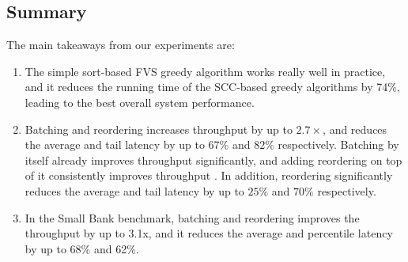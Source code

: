 
%





\subsection{Summary}

The main takeaways from our experiments are:

\begin{enumerate}[leftmargin=*, nolistsep]
\item The simple sort-based FVS greedy algorithm works really well in practice, and it reduces the running time of the SCC-based greedy algorithms by 74\%, leading to the best overall system performance. 
 
\item Batching and reordering increases throughput by up to $2.7\times$, and reduces the average and tail latency by up to $67\%$ and $82\%$ respectively.
Batching by itself already improves throughput significantly, and adding reordering on top of it consistently improves throughput . In addition, reordering significantly reduces the average and tail latency by up to $25\%$ and $70\%$ respectively. 


\item In the Small Bank benchmark, batching and reordering improves the throughput by up to 3.1x, and it reduces the average and percentile latency by up to 68\% and 62\%.


\end{enumerate}
